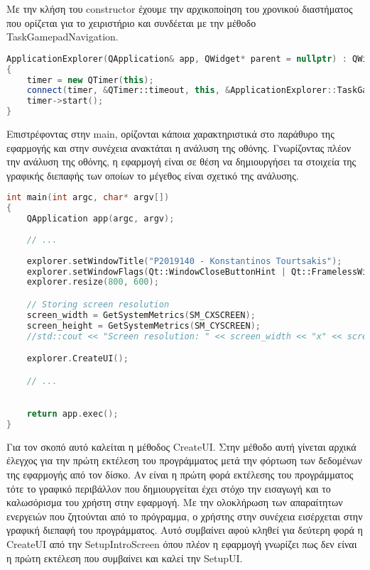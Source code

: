Με την κλήση του constructor έχουμε την αρχικοποίηση του χρονικού διαστήματος που ορίζεται για το
χειριστήριο και συνδέεται με την μέθοδο TaskGamepadNavigation.

\begin{lstlisting}[language=C++, style=cppstyle]
ApplicationExplorer(QApplication& app, QWidget* parent = nullptr) : QWidget(parent), app(app)
{
    timer = new QTimer(this);
    connect(timer, &QTimer::timeout, this, &ApplicationExplorer::TaskGamepadNavigation);
    timer->start();
}
\end{lstlisting}

Επιστρέφοντας στην main, ορίζονται κάποια χαρακτηριστικά στο παράθυρο της εφαρμογής και στην συνέχεια
ανακτάται η ανάλυση της οθόνης. Γνωρίζοντας πλέον την ανάλυση της οθόνης, η εφαρμογή είναι σε θέση να
δημιουργήσει τα στοιχεία της γραφικής διεπαφής των οποίων το μέγεθος είναι σχετικό της ανάλυσης.

\begin{lstlisting}[language=C++, style=cppstyle]
int main(int argc, char* argv[]) 
{
    QApplication app(argc, argv);
    
    // ...
    
    explorer.setWindowTitle("P2019140 - Konstantinos Tourtsakis");
    explorer.setWindowFlags(Qt::WindowCloseButtonHint | Qt::FramelessWindowHint);
    explorer.resize(800, 600);

    // Storing screen resolution
    screen_width = GetSystemMetrics(SM_CXSCREEN);
    screen_height = GetSystemMetrics(SM_CYSCREEN);
    //std::cout << "Screen resolution: " << screen_width << "x" << screen_height << std::endl;

    explorer.CreateUI();

    // ...

    
    return app.exec();
}
\end{lstlisting}

Για τον σκοπό αυτό καλείται η μέθοδος CreateUI. Στην μέθοδο αυτή γίνεται αρχικά έλεγχος για την
πρώτη εκτέλεση του προγράμματος μετά την φόρτωση των δεδομένων της εφαρμογής από τον δίσκο. Αν
είναι η πρώτη φορά εκτέλεσης του προγράμματος τότε το γραφικό περιβάλλον που δημιουργείται έχει
στόχο την εισαγωγή και το καλωσόρισμα του χρήστη στην εφαρμογή. Με την ολοκλήρωση των απαραίτητων
ενεργειών που ζητούνται από το πρόγραμμα, ο χρήστης στην συνέχεια εισέρχεται στην γραφική διεπαφή
του προγράμματος. Αυτό συμβαίνει αφού κληθεί για δεύτερη φορά η CreateUI από την SetupIntroScreen
όπου πλέον η εφαρμογή γνωρίζει πως δεν είναι η πρώτη εκτέλεση που συμβαίνει και καλεί την SetupUI.

